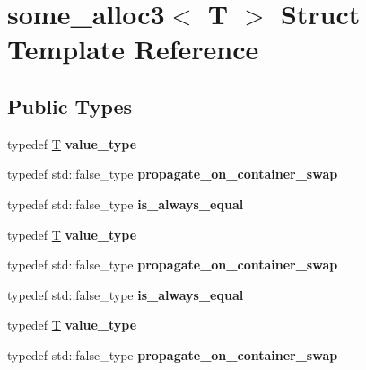 \hypertarget{structsome__alloc3}{}\section{some\+\_\+alloc3$<$ T $>$ Struct Template Reference}
\label{structsome__alloc3}
\subsection*{Public Types}
\begin{DoxyCompactItemize}
\item 
\mbox{\label{structsome__alloc3_a859670f2c07ffe08a8b7c4fdc380b21f}} 
typedef \mbox{\hyperlink{struct_t}{T}} {\bfseries value\+\_\+type}
\item 
\mbox{\label{structsome__alloc3_a0ef9538889b4aeddeb81689c107f3455}} 
typedef std\+::false\+\_\+type {\bfseries propagate\+\_\+on\+\_\+container\+\_\+swap}
\item 
\mbox{\label{structsome__alloc3_a8507fb4590dc6d728bf639d9691af063}} 
typedef std\+::false\+\_\+type {\bfseries is\+\_\+always\+\_\+equal}
\item 
\mbox{\label{structsome__alloc3_a859670f2c07ffe08a8b7c4fdc380b21f}} 
typedef \mbox{\hyperlink{struct_t}{T}} {\bfseries value\+\_\+type}
\item 
\mbox{\label{structsome__alloc3_a0ef9538889b4aeddeb81689c107f3455}} 
typedef std\+::false\+\_\+type {\bfseries propagate\+\_\+on\+\_\+container\+\_\+swap}
\item 
\mbox{\label{structsome__alloc3_a8507fb4590dc6d728bf639d9691af063}} 
typedef std\+::false\+\_\+type {\bfseries is\+\_\+always\+\_\+equal}
\item 
\mbox{\label{structsome__alloc3_a859670f2c07ffe08a8b7c4fdc380b21f}} 
typedef \mbox{\hyperlink{struct_t}{T}} {\bfseries value\+\_\+type}
\item 
\mbox{\label{structsome__alloc3_a0ef9538889b4aeddeb81689c107f3455}} 
typedef std\+::false\+\_\+type {\bfseries propagate\+\_\+on\+\_\+container\+\_\+swap}

\end{DoxyCompactItemize}
